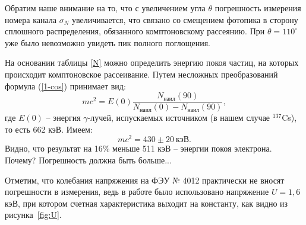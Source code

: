 \documentclass[a4paper,12pt]{article} %
\begin{document}
	Обратим наше внимание на то, что с увеличением угла $\theta$ погрешность измерения номера канала $\sigma_N$ увеличивается, что связано со смещением фотопика в сторону сплошного распределения, обязанного комптоновскому рассеянию. При $\theta = 110^\circ$ уже было невозможно увидеть пик полного поглощения.
	
	На основании таблицы \ref{N} можно определить энергию покоя частиц, на которых происходит комптоновское рассеивание. Путем несложных преобразований формула (\ref{1-cos}) принимает вид:
	\begin{equation*}
		mc^2 = E(0) \frac{N_\text{наил}(90)}{N_\text{наил}(0)-N_\text{наил}(90)},
	\end{equation*}
	где $E(0)$ -- энергия $\gamma$-лучей, испускаемых источником (в нашем случае $^{137}$Cs), то есть 662 кэВ. Имеем:
	\[
	\boxed{mc^2 = 430 \pm 20 \ \text{кэВ}}.
	\]
	Видно, что результат на 16\% меньше 511 кэВ -- энергии покоя электрона. Почему? Погрешность должна быть больше...
	
	Отметим, что колебания напряжения на ФЭУ № 4012 практически не вносят погрешности в измерения, ведь в работе было использовано напряжение $U = 1,6$ кэВ, при котором счетная характеристика выходит на константу, как видно из рисунка~\ref{fig:U}.
	
	
	
	
\end{document}
